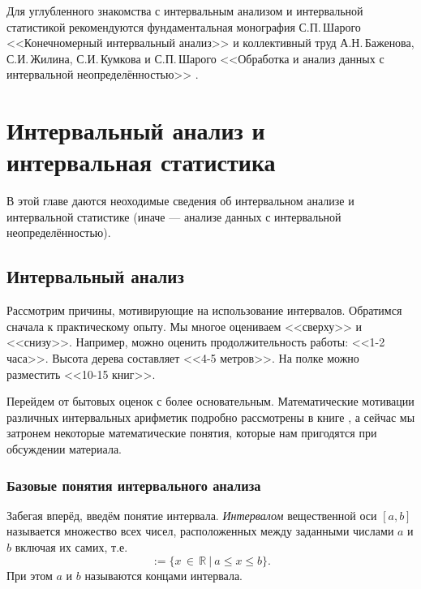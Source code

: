 \documentclass[a5paper,openany]{book}
\begin{document}
Для углубленного знакомства с интервальным анализом и интервальной статистикой рекомендуются фундаментальная монография С.П.\,Шарого <<Конечномерный интервальный анализ>> \cite{SharyBook} и коллективный труд А.Н.\,Баженова, С.И.\,Жилина, С.И.\,Кумкова и С.П.\,Шарого <<Обработка и анализ данных с интервальной неопределённостью>> \cite{BookIntStat}.


\chapter{Интервальный анализ и интервальная статистика}\label{InteAnalData}

В этой главе даются неоходимые сведения об интервальном анализе и интервальной статистике (иначе --- анализе данных с интервальной неопределённостью). 

\section{Интервальный анализ} \label{InteAnalysis}

Рассмотрим причины, мотивирующие на использование интервалов.  
Обратимся сначала к практическому опыту. Мы многое оцениваем <<сверху>> и  <<снизу>>. Например, можно оценить продолжительность работы: <<1-2 часа>>. Высота дерева составляет <<4-5 метров>>. На полке можно разместить <<10-15 книг>>.

Перейдем от бытовых оценок с более основательным.
Математические мотивации различных интервальных арифметик подробно рассмотрены в книге \cite{SharyBook}, а сейчас мы затронем некоторые математические понятия, которые нам пригодятся при обсуждении материала.


\subsection{Базовые понятия интервального анализа} \label{InteAnalysisBasic}

Забегая вперёд, введём понятие интервала.
\emph{Интервалом} вещественной оси $[a,b]$ называется множество всех чисел, расположенных между заданными числами  $a$ и $b$ включая их самих, т.е. 
\begin{equation*}
[a,b]:= \{x\, \in \,\mathbb{R}\ |\ a \leq x \leq b \}.
\end{equation*}
При этом $a$ и $b$  называются концами интервала.
\end{document}
